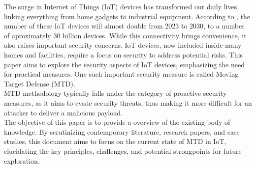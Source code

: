 The surge in Internet of Things (IoT) devices has transformed our daily lives, linking everything from home gadgets to industrial equipment. According to \cite{number_of_iot_devices}, the number of these IoT devices will almost double from 2023 to 2030, to a number of aproximately 30 billion devices. While this connectivity brings convenience, it also raises important security concerns. IoT devices, now included inside many homes and facilities, require a focus on security to address potential risks. This paper aims to explore the security aspects of IoT devices, emphasizing the need for practical measures. One such important security measure is called Moving Target Defense (MTD).\\
MTD methodology typically falls under the category of proactive security measures, as it aims to evade security threats, thus making it more difficult for an attacker to deliver a malicious payload.\\
The objective of this paper is to provide a overview of the existing body of knowledge. By scrutinizing contemporary literature, research papers, and case studies, this document aims to focus on the current state of MTD in IoT, elucidating the key principles, challenges, and potential strongpoints for future exploration.